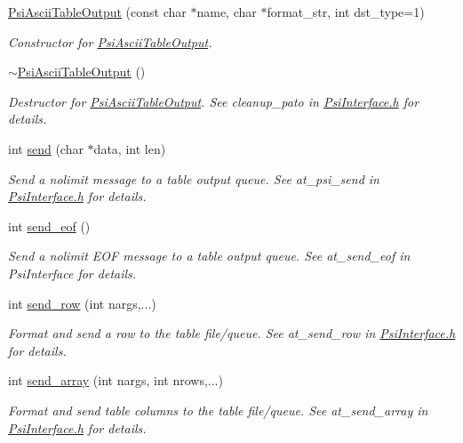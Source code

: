 \begin{DoxyCompactItemize}
\item 
\hyperlink{classPsiAsciiTableOutput_a4ed7d46502d5a0212761c9403775237c}{Psi\+Ascii\+Table\+Output} (const char $\ast$name, char $\ast$format\+\_\+str, int dst\+\_\+type=1)
\begin{DoxyCompactList}\small\item\em Constructor for \hyperlink{classPsiAsciiTableOutput}{Psi\+Ascii\+Table\+Output}. \end{DoxyCompactList}\item 
\mbox{\label{classPsiAsciiTableOutput_a6d407f3f9ad5b585ccb875bddfe2fd40}} 
\hyperlink{classPsiAsciiTableOutput_a6d407f3f9ad5b585ccb875bddfe2fd40}{$\sim$\+Psi\+Ascii\+Table\+Output} ()
\begin{DoxyCompactList}\small\item\em Destructor for \hyperlink{classPsiAsciiTableOutput}{Psi\+Ascii\+Table\+Output}. See cleanup\+\_\+pato in \hyperlink{PsiInterface_8h_source}{Psi\+Interface.\+h} for details. \end{DoxyCompactList}\item 
int \hyperlink{classPsiAsciiTableOutput_a36b070546cacc2522dca60b3eb7c1af1}{send} (char $\ast$data, int len)
\begin{DoxyCompactList}\small\item\em Send a nolimit message to a table output queue. See at\+\_\+psi\+\_\+send in \hyperlink{PsiInterface_8h_source}{Psi\+Interface.\+h} for details. \end{DoxyCompactList}\item 
int \hyperlink{classPsiAsciiTableOutput_a5a4ecadfd80cdb8397eda38a0f178320}{send\+\_\+eof} ()
\begin{DoxyCompactList}\small\item\em Send a nolimit E\+OF message to a table output queue. See at\+\_\+send\+\_\+eof in Psi\+Interface for details. \end{DoxyCompactList}\item 
int \hyperlink{classPsiAsciiTableOutput_af558c3508abf8c61122286166f8b09a1}{send\+\_\+row} (int nargs,...)
\begin{DoxyCompactList}\small\item\em Format and send a row to the table file/queue. See at\+\_\+send\+\_\+row in \hyperlink{PsiInterface_8h_source}{Psi\+Interface.\+h} for details. \end{DoxyCompactList}\item 
int \hyperlink{classPsiAsciiTableOutput_a9e72e278e8955142969c53e68a7b36e5}{send\+\_\+array} (int nargs, int nrows,...)
\begin{DoxyCompactList}\small\item\em Format and send table columns to the table file/queue. See at\+\_\+send\+\_\+array in \hyperlink{PsiInterface_8h_source}{Psi\+Interface.\+h} for details. \end{DoxyCompactList}\end{DoxyCompactItemize}


